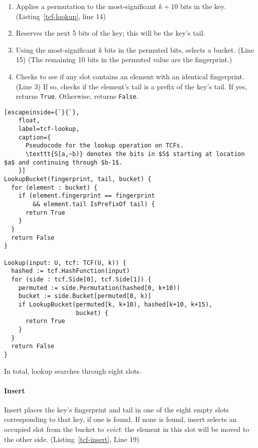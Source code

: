\documentclass[sigconf, nonacm]{acmart}
\begin{document}
\begin{enumerate}
\item Applies a permutation to the most-significant $k+10$ bits in the key. (Listing~\ref{tcf-lookup}, line 14)
\item Reserves the next 5 bits of the key; this will be the key's tail.
\item Using the most-significant $k$ bits in the permuted bits, selects a bucket. (Line 15)
(The remaining 10 bits in the permuted value are the fingerprint.)
\item Checks to see if any slot contains an element with an identical fingerprint. (Line 3)
If so, checks if the element's tail is a prefix of the key's tail.
If yes, returns \verb|True|.
Otherwise, returns \verb|False|.
\end{enumerate}


\begin{lstlisting}[escapeinside={`}{`},
    float,
    label=tcf-lookup,
    caption={
      Pseudocode for the lookup operation on TCFs.
      \texttt{S[a,~b)} denotes the bits in $S$ starting at location $a$ and continuing through $b-1$.
    }]
LookupBucket(fingerprint, tail, bucket) {
  for (element : bucket) {
    if (element.fingerprint == fingerprint
        && element.tail IsPrefixOf tail) {
      return True
    }
  }
  return False
}

Lookup(input: U, tcf: TCF(U, k)) {
  hashed := tcf.HashFunction(input)
  for (side : tcf.Side[0], tcf.Side[1]) {
    permuted := side.Permutation(hashed[0, k+10))
    bucket := side.Bucket[permuted[0, k)]
    if LookupBucket(permuted[k, k+10), hashed[k+10, k+15),
                    bucket) {
      return True
    }
  }
  return False
}
\end{lstlisting}


In total, lookup searches through eight slots.

\paragraph{Insert}
Insert places the key's fingerprint and tail in one of the eight empty slots corresponding to that key, if one is found.
If none is found, insert selects an occupied slot from the bucket to {\em evict}: the element in this slot will be moved to the other side. (Listing~\ref{tcf-insert}, Line 19)
\end{document}
